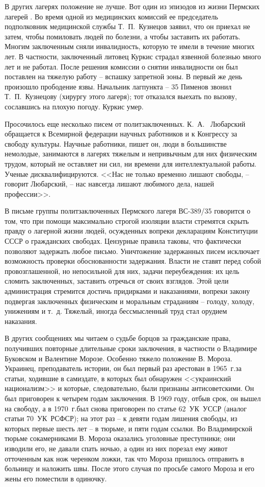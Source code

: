 \documentclass{book}
\begin{document}
В других лагерях положение не лучше. Вот один из эпизодов из жизни Пермских лагерей . Во время одной из медицинских комиссий ее председатель подполковник медицинской службы Т.~П.~Кузнецов заявил, что он приехал не затем, чтобы помиловать людей по болезни, а чтобы заставить их работать. Многим заключенным сняли инвалидность, которую те имели в течение многих лет. В частности, заключенный литовец Куркис страдал язвенной болезнью много лет и не работал. После решения комиссии о снятии инвалидности он был поставлен на тяжелую работу -- вспашку запретной зоны. В первый же день произошло прободение язвы. Начальник лагпункта -- 35 Пименов звонил Т.~П.~Кузнецову (хирургу этого лагеря); тот отказался выехать по вызову, сославшись на плохую погоду. Куркис умер.

Просочилось еще несколько писем от политзаключенных. К.~А.~	Любарский обращается к Всемирной федерации научных работников и к Конгрессу за свободу культуры. Научные работники, пишет он, люди в большинстве немолодые, занимаются в лагерях тяжелым и непривычным для них физическим трудом, который не оставляет ни сил, ни времени для интеллектуальной работы. Ученые дисквалифицируются. <<Нас не только временно лишают свободы, -- говорит Любарский, -- нас навсегда лишают любимого дела, нашей профессии>>.

В письме группы политзаключенных Пермского лагеря ВС-389/35 говорится о том, что при помощи максимально строгой изоляции власти стремятся скрыть правду о лагерной жизни людей, осужденных вопреки декларациям Конституции СССР о гражданских свободах. Цензурные правила таковы, что фактически позволяют задержать любое письмо. Уничтожение задержанных писем исключает возможность проверки обоснованности задержания. Власти не ставят перед собой провозглашенной, но непосильной для них, задачи переубеждения: их цель   сломить заключенных, заставить отречься от своих взглядов. Этой цели администрация стремится достичь придирками и наказаниями, вопреки закону подвергая заключенных физическим и моральным страданиям -- голоду, холоду, унижениям и т.~д. Тяжелый, иногда бессмысленный труд стал орудием наказания.

В других сообщениях мы читаем о судьбе борцов за гражданские права, получивших повторные длительные сроки заключения, в частности о Владимире Буковском и Валентине Морозе. Особенно тяжело положение В. Мороза. Украинец, преподаватель истории, он был первый раз арестован в 1965~г.за статьи, ходившие в самиздате, в которых был обнаружен <<украинский национализм>> и которые, следовательно, были признаны антисоветскими. Он был приговорен к четырем годам заключения. В 1969 году, отбыв срок, он вышел на свободу, а в 1970~г.был снова приговорен по статье 62~УК~УССР (аналог статьи 70~УК~РСФСР); на этот раз -- к девяти годам лишения свободы, из которых первые шесть лет -- в тюрьме, и пяти годам ссылки. Во Владимирской тюрьме сокамерниками В. Мо­роза оказались уголовные преступники; они изводили его, не давали спать ночью, а один из них порезал ему живот отточенным как нож черенком ложки, так что Мороза пришлось отпра­вить в больницу и наложить швы. После этого случая по просьбе самого Мороза и его жены его поместили 
в одиночку.
\end{document}
